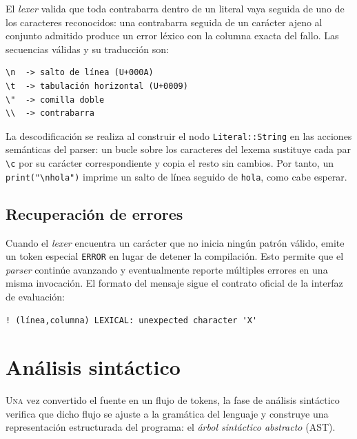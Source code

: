 \documentclass[11pt,a4paper,oneside,openany]{report}
\newcommand{\code}[1]{\texttt{#1}}
\begin{document}
El \textit{lexer} valida que toda contrabarra dentro de un literal vaya seguida
de uno de los caracteres reconocidos: una contrabarra seguida de un carácter
ajeno al conjunto admitido produce un error léxico con la columna exacta del
fallo. Las secuencias válidas y su traducción son:

\begin{lstlisting}[style=base,numbers=none,caption={Tabla de descodificación aplicada al construir \code{Literal::String}.}]
\n  -> salto de línea (U+000A)
\t  -> tabulación horizontal (U+0009)
\"  -> comilla doble
\\  -> contrabarra
\end{lstlisting}

La descodificación se realiza al construir el nodo \code{Literal::String} en las
acciones semánticas del parser: un bucle sobre los caracteres del lexema
sustituye cada par \code{\textbackslash{}c} por su carácter correspondiente y
copia el resto sin cambios. Por tanto, un \code{print("\textbackslash{}nhola")}
imprime un salto de línea seguido de \code{hola}, como cabe esperar.

\section{Recuperación de errores}

Cuando el \textit{lexer} encuentra un carácter que no inicia ningún patrón válido,
emite un token especial \code{ERROR} en lugar de detener la compilación. Esto permite
que el \textit{parser} continúe avanzando y eventualmente reporte múltiples errores
en una misma invocación. El formato del mensaje sigue el contrato oficial de la
interfaz de evaluación:

\begin{lstlisting}[style=base,numbers=none,caption={Formato estándar de error léxico.}]
! (línea,columna) LEXICAL: unexpected character 'X'
\end{lstlisting}

\chapter{Análisis sintáctico}
\label{cap:par}

\lettrine[lines=2,findent=2pt,nindent=0pt]{U}{na} vez convertido el fuente en un flujo
de tokens, la fase de análisis sintáctico verifica que dicho flujo se ajuste a la
gramática del lenguaje y construye una representación estructurada del programa:
el \textit{árbol sintáctico abstracto} (AST).
\end{document}
